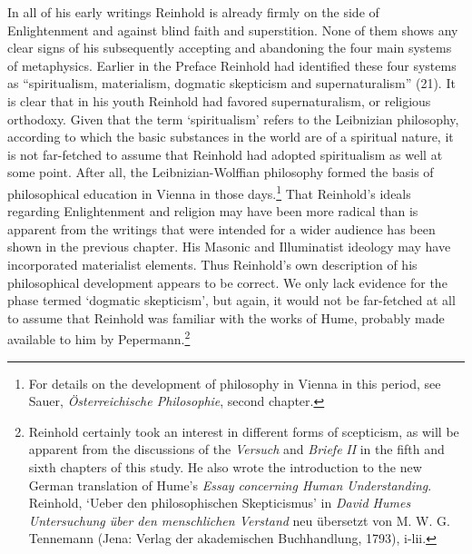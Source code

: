 In all of his early writings Reinhold is already firmly on the side of Enlightenment and against blind faith and superstition. None of them shows any clear signs of his subsequently accepting and abandoning the four main systems of metaphysics. Earlier in the Preface Reinhold had identified these four systems as ``spiritualism, materialism, dogmatic skepticism and supernaturalism'' (21). It is clear that in his youth Reinhold had favored supernaturalism, or religious orthodoxy. Given that the term `spiritualism' refers to the Leibnizian philosophy, according to which the basic substances in the world are of a spiritual nature, it is not far{-}fetched to assume that Reinhold had adopted spiritualism as well at some point. After all, the Leibnizian{-}Wolffian philosophy formed the basis of philosophical education in Vienna in those days.\footnote{ For details on the development of philosophy in Vienna in this period, see Sauer, \textit{\"{O}sterreichische Philosophie}, second chapter.} That Reinhold's ideals regarding Enlightenment and religion may have been more radical than is apparent from the writings that were intended for a wider audience has been shown in the previous chapter. His Masonic and Illuminatist ideology may have incorporated materialist elements. Thus Reinhold's own description of his philosophical development appears to be correct. We only lack evidence for the phase termed `dogmatic skepticism', but again, it would not be far{-}fetched at all to assume that Reinhold was familiar with the works of Hume, probably made available to him by Pepermann.\footnote{ Reinhold certainly took an interest in different forms of scepticism, as will be apparent from the discussions of the \textit{Versuch }and \textit{Briefe} \textit{II} in the fifth and sixth chapters of this study. He also wrote the introduction to the new German translation of Hume's \textit{Essay concerning Human Understanding}. Reinhold, `Ueber den philosophischen Skepticismus' in \textit{David Humes Untersuchung \"{u}ber den menschlichen Verstand} neu \"{u}bersetzt von M. W. G. Tennemann (Jena: Verlag der akademischen Buchhandlung, 1793), i{-}lii.} 

